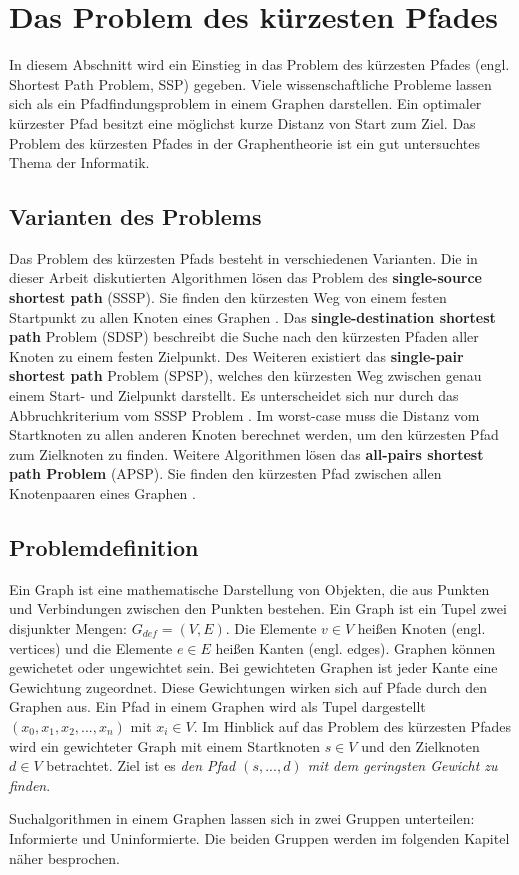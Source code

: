 \chapter{Das Problem des kürzesten Pfades}

In diesem Abschnitt wird ein Einstieg in das Problem des kürzesten Pfades (engl. Shortest Path Problem, SSP) gegeben. Viele wissenschaftliche Probleme lassen sich als ein Pfadfindungsproblem in einem Graphen darstellen\cite{HartNilssonandRaphael.1968}. Ein optimaler kürzester Pfad besitzt eine möglichst kurze Distanz von Start zum Ziel. Das Problem des kürzesten Pfades in der Graphentheorie ist ein gut untersuchtes Thema der Informatik\cite{Madkour.2017}.


\section{Varianten des Problems}

Das Problem des kürzesten Pfads besteht in verschiedenen Varianten. Die in dieser Arbeit diskutierten Algorithmen lösen das Problem des \textbf{single-source shortest path} (SSSP). Sie finden den kürzesten Weg von einem festen Startpunkt zu allen Knoten eines Graphen \cite{Gu.2018}. Das \textbf{single-destination shortest path} Problem (SDSP)  beschreibt die Suche nach den kürzesten Pfaden aller Knoten zu einem festen Zielpunkt. Des Weiteren existiert das \textbf{single-pair shortest path} Problem (SPSP), welches den kürzesten Weg zwischen genau einem Start- und Zielpunkt darstellt. Es unterscheidet sich nur durch das Abbruchkriterium vom SSSP Problem \cite{Ottmann.2017}. Im worst-case muss die Distanz vom Startknoten zu allen anderen Knoten berechnet werden, um den kürzesten Pfad zum Zielknoten zu finden. Weitere Algorithmen lösen das \textbf{all-pairs shortest path Problem} (APSP). Sie finden den kürzesten Pfad zwischen allen Knotenpaaren eines Graphen \cite{Cormen.2009}.


\section{Problemdefinition}

Ein Graph ist eine mathematische Darstellung von Objekten, die aus Punkten und Verbindungen zwischen den Punkten bestehen. Ein Graph ist ein Tupel zwei disjunkter Mengen: $G_{def}= (V,E)$. Die Elemente $v \in V$ heißen Knoten (engl. vertices) und die Elemente $e \in E$ heißen Kanten (engl. edges). Graphen können gewichetet oder ungewichtet sein. Bei gewichteten Graphen ist jeder Kante eine Gewichtung zugeordnet. Diese Gewichtungen wirken sich auf Pfade durch den Graphen aus\cite{Gross.2004}. Ein Pfad in einem Graphen wird als Tupel dargestellt $\left ( x_{0}, x_{1}, x_{2}, ..., x_{n} \right )$ mit $x_{i} \in V$.  Im Hinblick auf das Problem des kürzesten Pfades wird ein gewichteter Graph mit einem Startknoten $s \in V$ und den Zielknoten $d \in V$ betrachtet. Ziel ist es \textit{den Pfad  $\left ( s, ..., d \right )$ mit dem geringsten Gewicht zu finden}\cite{Madkour.2017}. 



Suchalgorithmen in einem Graphen lassen sich in zwei Gruppen unterteilen:
Informierte und Uninformierte. Die beiden Gruppen werden im folgenden Kapitel
näher besprochen.

